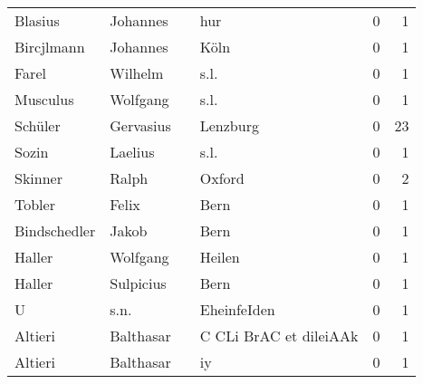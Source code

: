 \begin{center}
\begin{tiny}
\begin{longtabu}{llllrr}
                  Blasius &                           Johannes &             &                                         hur &          0 &         1 \\
               Bircjlmann &                           Johannes &             &                                        Köln &          0 &         1 \\
                    Farel &                            Wilhelm &             &                                        s.l. &          0 &         1 \\
                 Musculus &                           Wolfgang &             &                                        s.l. &          0 &         1 \\
                  Schüler &                          Gervasius &             &                                    Lenzburg &          0 &        23 \\
                    Sozin &                            Laelius &             &                                        s.l. &          0 &         1 \\
                  Skinner &                              Ralph &             &                                      Oxford &          0 &         2 \\
                   Tobler &                              Felix &             &                                        Bern &          0 &         1 \\
             Bindschedler &                              Jakob &             &                                        Bern &          0 &         1 \\
                   Haller &                           Wolfgang &             &                                      Heilen &          0 &         1 \\
                   Haller &                          Sulpicius &             &                                        Bern &          0 &         1 \\
                        U &                               s.n. &             &                                 EheinfeIden &          0 &         1 \\
                  Altieri &                          Balthasar &             &                      C CLi BrAC et dileiAAk &          0 &         1 \\
                  Altieri &                          Balthasar &             &                                          iy &          0 &         1 \\

\end{longtabu}
\end{tiny}
\end{center}
